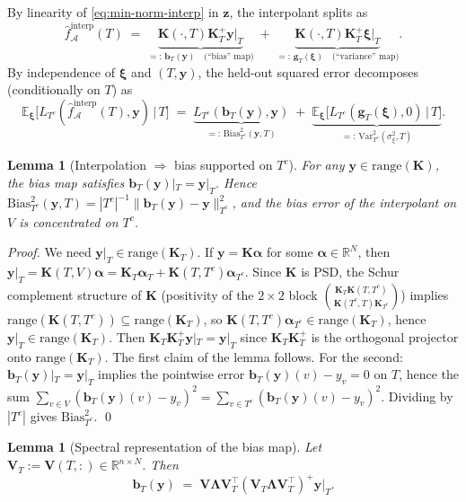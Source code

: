 \documentclass[11pt,a4paper]{article}
\theoremstyle{plain}
\newtheorem{lemma}[theorem]{Lemma}
\theoremstyle{definition}
\theoremstyle{remark}
\newcommand{\by}{\mathbf{y}}
\newcommand{\bxi}{\boldsymbol{\xi}}
\newcommand{\balpha}{\boldsymbol{\alpha}}
\newcommand{\bK}{\mathbf{K}}
\newcommand{\bV}{\mathbf{V}}
\newcommand{\bLambda}{\boldsymbol{\Lambda}}
\newcommand{\bz}{\mathbf{z}}
\newcommand{\bg}{\mathbf{g}}
\newcommand{\bb}{\mathbf{b}}
\newcommand{\E}{\mathbb{E}}
\newcommand{\R}{\mathbb{R}}
\newcommand{\Acal}{\mathcal{A}}
\newcommand{\range}{\mathrm{range}}
\begin{document}
By linearity of \eqref{eq:min-norm-interp} in $\bz$, the
interpolant splits as
\begin{equation}
    \hat f^{\mathrm{interp}}_\Acal(T)
    \;=\; \underbrace{\bK(\cdot, T)\bK_T^+ \by|_T}_{=:\, \bb_T(\by)\quad \text{(``bias'' map)}}
    \;+\; \underbrace{\bK(\cdot, T)\bK_T^+ \bxi|_T}_{=:\, \bg_T(\bxi)\quad \text{(``variance'' map)}}.
    \label{eq:bv-split}
\end{equation}
By independence of $\bxi$ and $(T, \by)$, the held-out squared
error decomposes (conditionally on $T$) as
\begin{equation}
    \E_\bxi\!\big[L_{T^c}(\hat f^{\mathrm{interp}}_\Acal(T), \by) \,|\, T\big]
    \;=\; \underbrace{L_{T^c}(\bb_T(\by), \by)}_{=:\, \mathrm{Bias}_{T^c}^2(\by, T)}
        \;+\; \underbrace{\E_\bxi\!\big[L_{T^c}(\bg_T(\bxi), 0) \,|\, T\big]}_{=:\, \mathrm{Var}_{T^c}^2(\sigma_\xi^2, T)}.
    \label{eq:bv-decomp}
\end{equation}

\begin{lemma}[Interpolation $\Rightarrow$ bias supported on $T^c$]
\label{lem:bias-on-tcomplement}
For any $\by \in \range(\bK)$, the bias map satisfies
$\bb_T(\by)|_T = \by|_T$. Hence
$\mathrm{Bias}_{T^c}^2(\by, T) = |T^c|^{-1}\|\bb_T(\by) - \by\|_{T^c}^2$,
and the bias error of the interpolant on $V$ is concentrated on $T^c$.
\end{lemma}

\begin{proof}
We need $\by|_T \in \range(\bK_T)$. If $\by = \bK\balpha$ for some
$\balpha \in \R^N$, then
$\by|_T = \bK(T, V)\balpha = \bK_T \balpha_T + \bK(T, T^c)\balpha_{T^c}$.
Since $\bK$ is PSD, the Schur complement structure of $\bK$
(positivity of the $2\times 2$ block $\binom{\bK_T \bK(T,T^c)}{\bK(T^c,T) \bK_{T^c}}$)
implies $\range(\bK(T, T^c)) \subseteq \range(\bK_T)$, so
$\bK(T, T^c)\balpha_{T^c} \in \range(\bK_T)$, hence
$\by|_T \in \range(\bK_T)$. Then $\bK_T \bK_T^+ \by|_T = \by|_T$
since $\bK_T\bK_T^+$ is the orthogonal projector onto $\range(\bK_T)$.
The first claim of the lemma follows.
For the second: $\bb_T(\by)|_T = \by|_T$ implies the pointwise
error $\bb_T(\by)(v) - y_v = 0$ on $T$, hence the sum
$\sum_{v \in V}(\bb_T(\by)(v) - y_v)^2 = \sum_{v \in T^c}(\bb_T(\by)(v) - y_v)^2$.
Dividing by $|T^c|$ gives $\mathrm{Bias}_{T^c}^2$.
\qed
\end{proof}

\begin{lemma}[Spectral representation of the bias map]
\label{lem:bias-spectral-rep}
Let $\bV_T := \bV(T, :) \in \R^{n \times N}$. Then
\begin{equation}
    \bb_T(\by)
    \;=\; \bV\bLambda\bV_T^\top (\bV_T\bLambda\bV_T^\top)^+ \by|_T.
    \label{eq:bias-spectral}
\end{equation}
\end{lemma}
\end{document}
